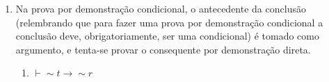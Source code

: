 \documentclass[12pt, a4paper,final]{article}
\newcounter{numero_coluna}
\newcommand\rowstyle{\stepcounter{numero_coluna}\arabic{numero_coluna}}
\newcommand \rownumber{(\rowstyle) }
\begin{document}
\begin{enumerate}
        
        \item Na prova por demonstração condicional, o antecedente da conclusão (relembrando que para fazer uma prova por demonstração condicional a conclusão deve, obrigatoriamente, ser uma condicional) é tomado como argumento, e tenta-se provar o consequente por demonstração direta.
        
        \begin{enumerate}
        \setlength \itemsep{1em}
        
            \item $\vdash \sim t \rightarrow \sim r$
            \phantom{\setcounter{numero_coluna}{0}} 
                

\end{enumerate}
\end{enumerate}
\end{document}
